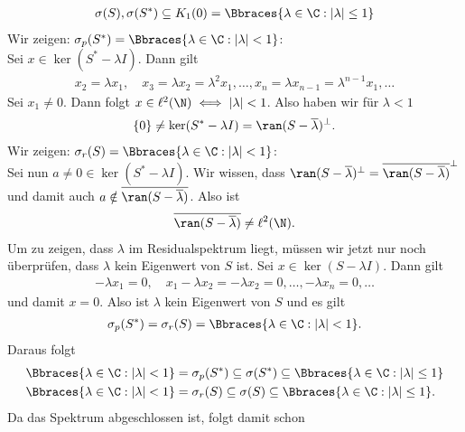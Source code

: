 \begin{solution}
\begin{enumerate}[label = (\alph*)]
  \begin{align*}
    \sigma(S), \sigma(S^*) \subseteq K_{1}(0) = \Bbraces{\lambda \in \C: |\lambda| \leq 1}
  \end{align*}
  Wir zeigen: $\sigma_p(S^\ast) = \Bbraces{\lambda \in \C: |\lambda| < 1}$: \\
  Sei $x \in \ker(S^* - \lambda I)$. Dann gilt
  \begin{align*}
    x_2 = \lambda x_1, \quad x_3 = \lambda x_2 = \lambda^2 x_1, \dots, x_n = \lambda x_{n-1} = \lambda^{n-1} x_1, \dots
  \end{align*}
  Sei $x_1 \neq 0$. Dann folgt $x \in \ell^2(\N) \iff |\lambda| < 1$.
  Also haben wir für $\lambda < 1$
  \begin{align*}
    \{0\} \neq \ker(S^* - \lambda I) = \ran(S - \overline{\lambda})^{\bot}.
  \end{align*}
  Wir zeigen: $\sigma_r(S) = \Bbraces{\lambda \in \C: |\lambda| < 1}$: \\
  Sei nun $a \neq 0 \in \ker(S^* - \lambda I)$.
  Wir wissen, dass $\ran(S - \overline{\lambda})^{\bot} = \overline{\ran(S - \overline{\lambda})}^{\bot}$
  und damit auch $a \notin \overline{\ran(S - \overline{\lambda})}$. Also ist
  \begin{align*}
     \overline{\ran(S - \overline{\lambda})} \neq \ell^2(\N).
  \end{align*}
  Um zu zeigen, dass $\lambda$ im Residualspektrum liegt, müssen wir jetzt nur noch
  überprüfen, dass $\lambda$ kein Eigenwert von $S$ ist.
  Sei $x \in \ker(S - \lambda I)$. Dann gilt
  \begin{align*}
    -\lambda x_1 = 0, \quad x_1 - \lambda x_2 = -\lambda x_2 = 0, \dots, -\lambda x_n = 0, \dots
  \end{align*}
  und damit $x = 0$. Also ist $\lambda$ kein Eigenwert von $S$ und es gilt
  \begin{align*}
    \sigma_p(S^\ast) = \sigma_r(S) = \Bbraces{\lambda \in \C: |\lambda| < 1}.
  \end{align*}
  Daraus folgt
  \begin{align*}
    \Bbraces{\lambda \in \C: |\lambda| < 1} &= \sigma_p(S^\ast) \subseteq \sigma(S^*) \subseteq \Bbraces{\lambda \in \C: |\lambda| \leq 1} \\
    \Bbraces{\lambda \in \C: |\lambda| < 1} &= \sigma_r(S) \subseteq \sigma(S) \subseteq \Bbraces{\lambda \in \C: |\lambda| \leq 1}.
  \end{align*}
  Da das Spektrum abgeschlossen ist, folgt damit schon
  \begin{align*}

\end{align*}
\end{enumerate}
\end{solution}
